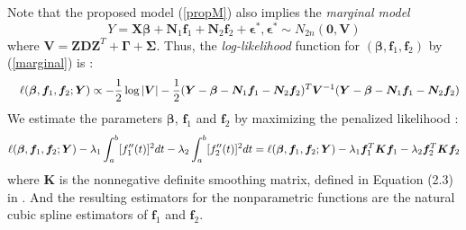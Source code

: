 \documentclass[12pt, notitlepage]{article}
\begin{document}
Note that the proposed model (\ref{propM}) also implies the {\it marginal model}
\begin{equation}\label{marginal}
Y = \boldsymbol{X}\boldsymbol{\beta} +
 \boldsymbol N_{1} \boldsymbol f_1 + 
  \boldsymbol N_{2} \boldsymbol f_2 + \boldsymbol \epsilon^*,   
\boldsymbol \epsilon^* \sim N_{2n}(\boldsymbol 0, \boldsymbol V) 
\end{equation}
where $\boldsymbol V = \boldsymbol  Z  \boldsymbol D  \boldsymbol Z^T
  +  \boldsymbol  \Gamma
  +   \boldsymbol \Sigma$.
  Thus, the {\it log-likelihood} function for 
$(\boldsymbol \beta, \boldsymbol f_1, \boldsymbol f_2)$ by (\ref{marginal}) is :
\begin{eqnarray*}
&& 
\ell (\boldsymbol \beta, \boldsymbol f_1, \boldsymbol f_2; \boldsymbol Y)
\propto
-{1 \over 2} \log |\boldsymbol V| 
 -{1 \over 2}
 (\boldsymbol Y - \boldsymbol\beta 
 - \boldsymbol N_1 \boldsymbol f_1 - \boldsymbol N_2 \boldsymbol f_2)^T 
 \boldsymbol V^{-1} 
  (\boldsymbol Y - \boldsymbol\beta  
  - \boldsymbol N_1 \boldsymbol f_1 - \boldsymbol N_2 \boldsymbol f_2)
\end{eqnarray*}
We   estimate the parameters $\boldsymbol \beta$, $\boldsymbol f_1$ and $\boldsymbol f_2$ by  maximizing  the penalized likelihood \citep*{Wang:Guo:Brow:quan:2000}:
\begin{equation} \label{penLog}
\ell(\mbox{\boldmath$\beta$}, \boldsymbol f_1, \boldsymbol f_2 ; \boldsymbol Y) 
 - \lambda_1\int_a^b [f_1^{\prime\prime}(t)]^2 dt  
 - \lambda_2 \int_a^b [f_2^{\prime\prime}(t)]^2 dt 
= 
\ell(\mbox{\boldmath$\beta$}, \boldsymbol f_1, \boldsymbol f_2 ; \boldsymbol Y) 
- \lambda_1
\boldsymbol f_1^T \boldsymbol K \boldsymbol f_1
 - \lambda_2
\boldsymbol f_2^T \boldsymbol K \boldsymbol f_2 
\end{equation}
where $\boldsymbol K$ is the nonnegative definite smoothing matrix, defined in Equation (2.3) in \citet{Green:1994}. 
And the resulting estimators for the nonparametric functions  are  the natural cubic spline estimators  of $\boldsymbol f_1$ and $\boldsymbol f_2$. 
\end{document}
